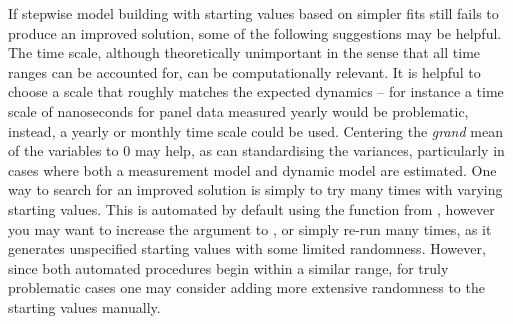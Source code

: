 \documentclass[nojss]{jss}\usepackage[]{graphicx}\usepackage[]{color}
\begin{document}
If stepwise model building with starting values based on simpler fits still fails to produce an improved solution, some of the following suggestions may be helpful.
The time scale, although theoretically unimportant in the sense that all time ranges can be accounted for, can be computationally relevant. It is helpful to choose a scale that roughly matches the expected dynamics -- for instance a time scale of nanoseconds for panel data measured yearly would be problematic, instead, a yearly or monthly time scale could be used. 
Centering the \textit{grand} mean of the variables to 0 may help, as can standardising the variances, particularly in cases where both a measurement model and dynamic model are estimated. 
One way to search for an improved solution is simply to try many times with varying starting values. This is automated by default using the  function from , however you may want to increase the  argument to , or simply re-run  many times, as it generates unspecified starting values with some limited randomness.  However, since both automated procedures begin within a similar range, for truly problematic cases one may consider adding more extensive randomness to the starting values manually.
\end{document}
